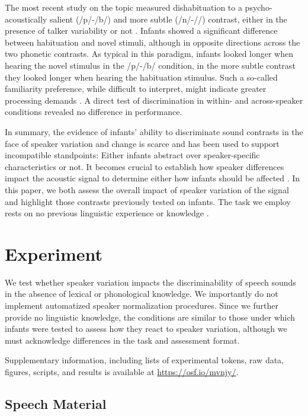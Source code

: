\documentclass[10pt,letterpaper]{article}
\begin{document}
The most recent study on the topic measured dishabituation to a psycho-acoustically salient (/p/-/b/) and more subtle (/n/-/\textipa{\ng}/) contrast, either in the presence of talker variability or not \cite{Clough2015}. Infants showed a significant difference between habituation and novel stimuli, although in opposite directions across the two phonetic contrasts. As typical in this paradigm, infants looked longer when hearing the novel stimulus in the /p/-/b/ condition, in the more subtle contrast they looked longer when hearing the habituation stimulus. Such a so-called familiarity preference, while difficult to interpret, might indicate greater processing demands \cite{HunterAmes}. A direct test of discrimination in within- and across-speaker conditions revealed no difference in performance.


In summary, the evidence of infants' ability to discriminate sound contrasts in the face of speaker variation and change is scarce and has been used to support incompatible standpoints: Either infants abstract over speaker-specific characteristics or not. It becomes crucial to establish how speaker differences impact the acoustic signal to determine either how infants should be affected  . In this paper, we both assess the overall impact of speaker variation of the signal and highlight those contrasts previously tested on infants. The task we employ rests on no previous linguistic experience or knowledge \cite{Schatz2013, Schatz2014, Martin2015}. 

\section{Experiment}

We test whether speaker variation impacts the discriminability of speech sounds in the absence of lexical or phonological knowledge. We importantly do not implement automatized speaker normalization procedures. Since we further provide no linguistic knowledge, the conditions are similar to those under which infants were tested to assess how they react to speaker variation, although we must acknowledge differences in the task and assessment format. 

Supplementary information, including lists of experimental tokens, raw data, figures, scripts, and results is available at \url{https://osf.io/mvnjy/}. 


\subsection{Speech Material}
\end{document}
